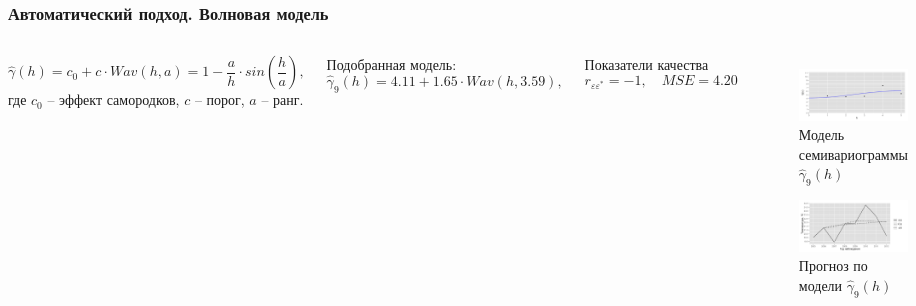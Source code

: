 \documentclass[10pt,pdf,aspectratio=169,hyperref={unicode}]{beamer}
\begin{document}
\begin{frame}
  \frametitle{Автоматический подход. \small{Волновая модель}}
  \begin{columns}[c]
  \column{3in}
  \begin{equation}
  \label{eq:wave}
    \widehat{\gamma}(h) = c_0 + c \cdot Wav(h, a) = 1 - \frac{a}{h} \cdot sin(\frac{h}{a}),
  \end{equation}
  где $ c_0 $ -- эффект самородков, $ c $ -- порог, $ a $ -- ранг.

  \vspace{0.5em}

  Подобранная модель:
  \begin{equation}
  \label{eq:gamma9}
    \widehat{\gamma}_9(h) = 4.11 + 1.65 \cdot Wav(h, 3.59),
  \end{equation}

  Показатели качества
  \begin{equation*}
    r_{\varepsilon\varepsilon^{*}} = -1, \quad MSE = 4.20
  \end{equation*}

  \column{3in}
  \vspace{-14.5pt}
  \begin{figure}[H]
    \includegraphics[width=0.9\linewidth]{../../figures/variogram/auto-rob-5-modeled.png} \\
    \caption{Модель семивариограммы $\widehat{\gamma}_9(h)$}
    \includegraphics[width=0.9\linewidth]{../../figures/variogram/auto-rob-5-cross-prediction.png}
    \caption{Прогноз по модели $\widehat{\gamma}_9(h)$}
  \end{figure}
  \end{columns}
\end{frame}
\end{document}
